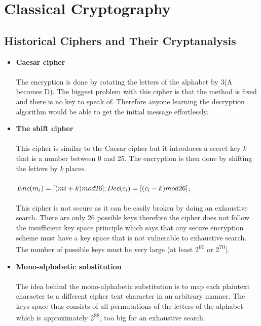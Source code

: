 \chapter{Classical Cryptography}

\section{Historical Ciphers and Their Cryptanalysis}

\begin{itemize}
    \item \textbf{Caesar cipher}\\\\
The encryption is done by rotating the letters of the alphabet by 3(A becomes D). The biggest problem
with this cipher is that the method is fixed and there is no key to speak of. Therefore anyone
learning the decryption algorithm would be able to get the initial message effortlessly.
    \item \textbf{The shift cipher}\\\\
This cipher is similar to the Caesar cipher but it introduces a secret key \textit{k} that is a number
between 0 and 25. The encryption is then done by shifting the letters by \textit{k} places.\\\\
\begin{math}Enc(m_{i}) = [(mi+k) mod 26];\\
Dec(c_{i}) = [(c_{i}-k) mod 26]\end{math};\\\\
This cipher is not secure as it can be easily broken by doing an exhaustive search. There are
only 26 possible keys therefore the cipher does not follow the insufficient key space principle
which says that any secure encryption scheme must have a key space that is not vulnerable to
exhaustive search. The number of possible keys must be very large (at least 2\textsuperscript{60} or 2\textsuperscript{70}).
    \item \textbf{Mono-alphabetic substitution}\\\\
The idea behind the mono-alphabetic substitution is to map each plaintext character to a
different cipher text character in an arbitrary manner. The keys space thus consists of all
permutations of the letters of the alphabet which is approximately 2\textsuperscript{88}, too big for an exhaustive search.\\

\end{itemize}
